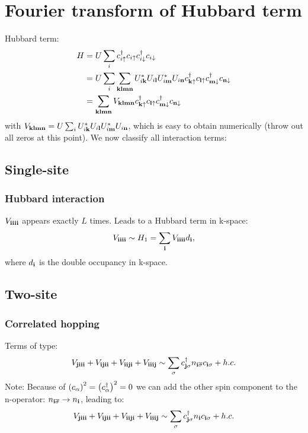 \documentclass[12pt,paper=a4,BCOR=16mm]{article}
\renewcommand{\c}[1]{c_{#1}}
\newcommand{\cdag}[1]{c^{\dagger}_{#1}}
\newcommand{\cs}[1]{c_{#1\sigma}}
\newcommand{\cdags}[1]{c^{\dagger}_{#1\sigma}}
\newcommand{\cUP}[1]{c_{#1\uparrow}}
\newcommand{\cdagUP}[1]{c^{\dagger}_{#1\uparrow}}
\newcommand{\cDN}[1]{c_{#1\downarrow}}
\newcommand{\cdagDN}[1]{c^{\dagger}_{#1\downarrow}}
\begin{document}
\section{Fourier transform of Hubbard term}

Hubbard term:
\begin{equation}
\begin{split}
H &= U\sum_{i} \cdagUP{i}\cUP{i}\cdagDN{i}\cDN{i}\\ 
&= U\sum_{i} \sum_{\v{k}\v{l}\v{m}\v{n}} U^*_{i\v{k}} U_{i\v{l}} U^*_{i\v{m}} U_{i\v{n}} \cdagUP{\v{k}}\cUP{\v{l}}\cdagDN{\v{m}}\cDN{\v{n}} \\
&= \sum_{\v{k}\v{l}\v{m}\v{n}} V_{\v{klmn}} \cdagUP{\v{k}}\cUP{\v{l}}\cdagDN{\v{m}}\cDN{\v{n}}
\end{split}
\end{equation}
with $V_{\mathbf{klmn}}= U \sum_{i} U^*_{i\mathbf{k}} U_{i\mathbf{l}} U^*_{i\mathbf{m}} U_{i\mathbf{n}}$, which is easy to obtain numerically (throw out all zeros at this point). We now classify all interaction terms:

\subsection{Single-site}

\subsubsection{Hubbard interaction}

$V_{\mathbf{iiii}}$ appears exactly $L$ times. Leads to a Hubbard term in k-space:
\begin{equation}
V_{\mathbf{iiii}} \sim H_1 = \sum_{\mathbf{i}} V_{\mathbf{iiii}} d_{\mathbf{i}},
\end{equation}
where $d_{\mathbf{i}}$ is the double occupancy in k-space.

\subsection{Two-site}

\subsubsection{Correlated hopping}

Terms of type:
\begin{equation}
V_{\v{jiii}} + V_{\v{ijii}} + V_{\v{iiji}} + V_{\v{iiij}} \sim \sum_{\sigma} \cdags{\v{j}} n_{\v{i}\overline{\sigma}} \cs{\v{i}} + h.c.
\end{equation}
Note: Because of $\lr{\c{\alpha}}^2=\lr{\cdag{\alpha}}^2=0$ we can add the other spin component to the n-operator: $n_{\mathbf{i}\overline{\sigma}} \to n_{\mathbf{i}}$, leading to:
\begin{equation}
V_{\v{jiii}} + V_{\v{ijii}} + V_{\v{iiji}} + V_{\v{iiij}} \sim \sum_{\sigma} \cdags{\v{j}} n_{\v{i}} \cs{\v{i}} + h.c.
\end{equation}
\end{document}

